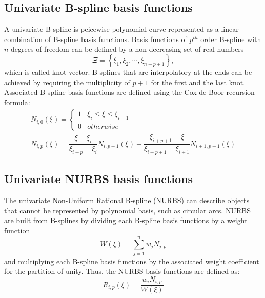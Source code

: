 \documentclass[preprint,12pt]{elsarticle}
\theoremstyle{remark}
\begin{document}
\subsection{Univariate B-spline basis functions}
A univariate B-spline is peicewise polynomial curve represented as a linear combination of B-spline basis functions. Basis functions of $p^{th}$ order B-spline with $n$ degrees of freedom can be defined by a non-decreasing set of real numbers
\begin{equation}
\Xi = \left\{{\xi_1,\xi_2,\cdots,\xi_{n+p+1}}\right\},
\end{equation}
which is called knot vector. B-splines that are interpolatory at the ends can be achieved by requiring the multiplicity of $p+1$ for the first and the last knot. Associated B-spline basis functions are defined using the Cox-de Boor recursion formula:
\begin{gather}
N_{i,0}(\xi)=\begin{cases}1 & \xi_i\leq{\xi}\leq{\xi_{i+1}}\\0 & otherwise \end{cases} \\
N_{i,p}(\xi)=\dfrac{\xi-\xi_i}{\xi_{i+p}-\xi_i}N_{i,p-1}(\xi)+\dfrac{\xi_{i+p+1}-\xi}{\xi_{i+p+1}-\xi_{i+1}}N_{i+1,p-1}(\xi)
\end{gather}
\subsection{Univariate NURBS basis functions}
The univariate Non-Uniform Rational B-spline (NURBS) can describe objects that cannot be represented by polynomial basis, such as circular arcs. NURBS are built from B-splines by dividing each B-spline basis functions by a weight function
\begin{equation}
W(\xi)=\sum_{j=1}^n w_jN_{j,p}
\end{equation}
and multiplying each B-spline basis functions by the associated weight coefficient for the partition of unity. Thus, the NURBS basis functions are defined as:
\begin{equation}
R_{i,p}(\xi)=\dfrac{w_iN_{i,p}}{W(\xi)}
\end{equation}
\end{document}
